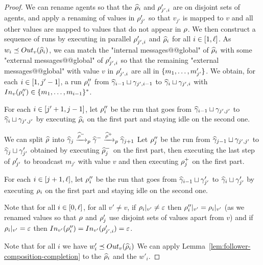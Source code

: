 \begin{proof}
We can rename agents so that the $\widehat{\run}_i$ and $\run'_{j',i}$ are on disjoint sets of agents, and apply a renaming of values in $\run'_{j'}$ so that $v_{j'}$ is mapped to $v$ and all other values are mapped to values that do not appear in $\run$.
We then construct a sequence of runs by executing in parallel $\run_{j',i}'$ and $\widehat{\run}_i$ for all $i\in\nset{1}{\ell}$. As $w_i \subword \voutput{v}{\widehat{\run}_i}$, we can match the "internal messages@@global" of $\widehat{\run}_i$ with some "external messages@@global" of $\run'_{j',i}$ so that the remaining "external messages@@global" with value $v$ in $\run'_{j',i}$ are all in $\set{m_1, \ldots, m'_{j'}}$. 
We obtain, for each $i \in \nset{1}{j'-1}$, a run $\run''_i$ from $\widehat{\config}_{i-1} \sqcup \config_{j', i-1}$ to $\widehat{\config}_{i} \sqcup \config_{j', i}$ with $\vinput{v}{\run''_i} \in \set{m_1, \ldots, m_{i-1}}^*$. 

For each $i \in \nset{j'+1}{j-1}$, let $\run''_i$ be the run that goes from $\widehat{\config}_{i-1} \sqcup \config_{j', j'}$ to $\widehat{\config}_{i} \sqcup \config_{j', j'}$ by executing $\widehat{\run}_i$ on the first part and staying idle on the second one.

We can split $\widehat{\run}$ into $\widehat{\config}_{j} \pstep{\widehat{\run}^-} \widehat{\config}^- \pstep{\widehat{\run}^+} \widehat{\config}_{j+1}$
Let $\run''_j$ be the run from $\widehat{\config}_{j-1} \sqcup \config_{j', j'}$ to $\widehat{\config}_{j} \sqcup \config'_{j'}$ obtained by executing $\widehat{\run}_{j}^-$ on the first part, then executing the last step of $\run'_{j'}$ to broadcast $m_{j'}$ with value $v$ and then executing $\run_{j}^+$ on the first part.

For each $i \in \nset{j+1}{\ell}$, let $\run''_i$ be the run that goes from $\widehat{\config}_{i-1} \sqcup \config'_{j'}$ to $\widehat{\config}_{i} \sqcup \config'_{j'}$ by executing $\run_i$ on the first part and staying idle on the second one.

Note that for all $i \in \nset{0}{\ell}$, for all $v' \neq v$, if $\vproj{v'}{\run_i} \neq \epsilon$ then $\vproj{v'}{\run''_i} = \vproj{v'}{\run_i}$ (as we renamed values so that $\run$ and $\run'_j$ use disjoint sets of values apart from $v$) and if $\vproj{v'}{\run_i} = \epsilon$ then $\vinput{v'}{\run''_i} = \vinput{v'}{\run'_{j',i}} = \epsilon$.

Note that for all $i$ we have $w'_i \subword \voutput{v}{\widehat{\run}_i}$
We can apply Lemma~\ref{lem:follower-composition-completion} to the $\widehat{\run}_i$ and the $w'_i$.


\end{proof}
